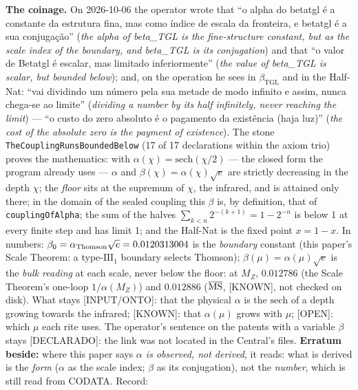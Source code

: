 \documentclass[11pt]{article}
\newcommand{\bTGL}{\beta_{\mathrm{TGL}}}\newcommand{\Msun}{M_{\odot}}\newcommand{\TGL}{\mathrm{TGL}}
\theoremstyle{definition}\newtheorem{deriv}{Derivation}
\begin{document}
\textbf{The coinage.} On 2026-10-06 the operator wrote that ``o alpha do betatgl é a constante da estrutura fina, mas como índice de escala da fronteira, e betatgl é a sua conjugação'' (\emph{the alpha of beta\_TGL is the fine-structure constant, but as the scale index of the boundary, and beta\_TGL is its conjugation}) and that ``o valor de Betatgl é escalar, mas limitado inferiormente'' (\emph{the value of beta\_TGL is scalar, but bounded below}); and, on the operation he sees in $\bTGL$ and in the Half-Nat: ``vai dividindo um número pela sua metade de modo infinito e assim, nunca chega-se ao limite'' (\emph{dividing a number by its half infinitely, never reaching the limit}) --- ``o custo do zero absoluto é o pagamento da existência (haja luz)'' (\emph{the cost of the absolute zero is the payment of existence}). The stone \texttt{TheCouplingRunsBoundedBelow} (17 of 17 declarations within the axiom trio) proves the mathematics: with $\alpha(\chi)=\mathrm{sech}(\chi/2)$ --- the closed form the program already uses --- $\alpha$ and $\beta(\chi)=\alpha(\chi)\sqrt e$ are strictly decreasing in the depth $\chi$; the \emph{floor} sits at the supremum of $\chi$, the infrared, and is attained only there; in the domain of the sealed coupling this $\beta$ is, by definition, that of \texttt{couplingOfAlpha}; the sum of the halves $\sum_{k<n}2^{-(k+1)}=1-2^{-n}$ is below 1 at every finite step and has limit 1; and the Half-Nat is the fixed point $x=1-x$. In numbers: $\beta_0=\alpha_{\rm Thomson}\sqrt e=0.0120313004$ is the \emph{boundary} constant (this paper's Scale Theorem: a type-$\mathrm{III}_1$ boundary selects Thomson); $\beta(\mu)=\alpha(\mu)\sqrt e$ is the \emph{bulk reading} at each scale, never below the floor: at $M_Z$, $0.012786$ (the Scale Theorem's one-loop $1/\alpha(M_Z)$) and $0.012886$ ($\overline{\rm MS}$, \textsf{[KNOWN]}, not checked on disk). What stays \textsf{[INPUT/ONTO]}: that the physical $\alpha$ is the $\mathrm{sech}$ of a depth growing towards the infrared; \textsf{[KNOWN]}: that $\alpha(\mu)$ grows with $\mu$; \textsf{[OPEN]}: which $\mu$ each rite uses. The operator's sentence on the patents with a variable $\beta$ stays \textsf{[DECLARADO]}: the link was not located in the Central's files. \textbf{Erratum beside:} where this paper says \emph{$\alpha$ is observed, not derived}, it reads: what is derived is the \emph{form} ($\alpha$ as the scale index; $\beta$ as its conjugation), not the \emph{number}, which is still read from CODATA. Record: 
\end{document}
